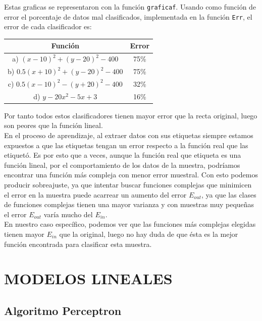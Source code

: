 \documentclass{article}
\begin{document}
Estas graficas se representaron con la función \texttt{graficaf}.
Usando como función de error el porcentaje de datos mal clasificados, implementada en la función \texttt{Err}, el error de cada clasificador es:

\begin{center}
\begin{tabular}{|c|c|}
\hline
\multicolumn{1}{|c|}{\textbf{Función}}& 
\textbf{Error}  \\ \hline
  a) $(x-10)^2+(y-20)^2-400$    & 75\% \\
  b) $0.5(x+10)^2+(y-20)^2-400$ & 75\% \\
  c) $0.5(x-10)^2-(y+20)^2-400$ & 32\% \\
  d) $y-20x^2-5x+3$             & 16\% \\ \hline
\end{tabular}
\end{center}

Por tanto todos estos clasificadores tienen mayor error que la recta original, luego son peores que la función lineal.\\

En el proceso de aprendizaje, al extraer datos con sus etiquetas siempre estamos expuestos a que las etiquetas tengan un error respecto a la función real que las etiquetó. Es por esto que a veces, aunque la función real que etiqueta es una función lineal, por el comportamiento de los datos de la muestra, podríamos encontrar una función más compleja con menor error muestral. Con esto podemos producir sobreajuste, ya que intentar buscar funciones complejas que minimicen el error en la muestra puede acarrear un aumento del error $E_{out}$, ya que las clases de funciones complejas tienen una mayor varianza y con muestras muy pequeñas el error $E_{out}$ varía mucho del $E_{in}$.\\
En nuestro caso específico, podemos ver que las funciones más complejas elegidas tienen mayor $E_{in}$ que la  original, luego no hay duda de que ésta es la mejor función encontrada para clasificar esta muestra.

\section{MODELOS LINEALES}

\subsection{Algoritmo Perceptron}
\end{document}
